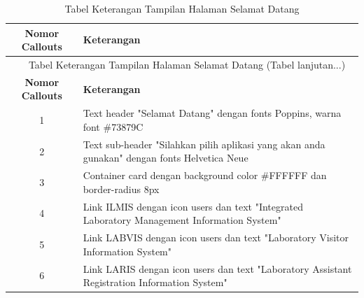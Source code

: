 \begin{enumerate}
	      {
	      \fontsize{11}{13}\selectfont
	      \begin{longtable}{c p{}}
		      \caption{Tabel Keterangan Tampilan Halaman Selamat Datang}                                                                     \\
		      \hline
		      \textbf{Nomor Callouts} & \textbf{Keterangan}                                                                                  \\
		      \hline
		      \endfirsthead

		      \multicolumn{2}{c}{\small\tablename\ \thetable\ {Tabel Keterangan Tampilan Halaman Selamat Datang} \space (Tabel lanjutan...)} \\
		      \hline
		      \textbf{Nomor Callouts} & \textbf{Keterangan}                                                                                  \\
		      \hline
		      \endhead

		      1                       & Text header "Selamat Datang" dengan fonts Poppins, warna font \#73879C                               \\
		      2                       & Text sub-header "Silahkan pilih aplikasi yang akan anda gunakan" dengan fonts Helvetica Neue         \\
		      3                       & Container card dengan background color \#FFFFFF dan border-radius 8px                                \\
		      4                       & Link ILMIS dengan icon users dan text "Integrated Laboratory Management Information System"          \\
		      5                       & Link LABVIS dengan icon users dan text "Laboratory Visitor Information System"                       \\
		      6                       & Link LARIS dengan icon users dan text "Laboratory Assistant Registration Information System"         \\
		      \hline
	      \end{longtable}
	      }


\end{enumerate}
